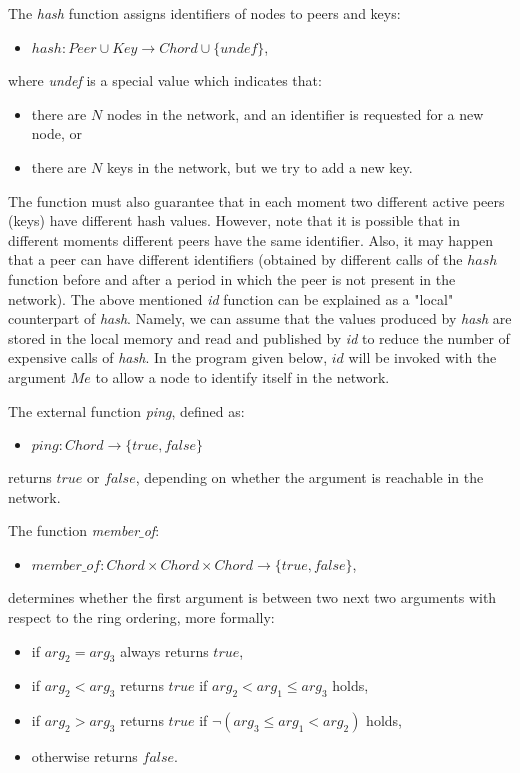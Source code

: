 \documentclass{amsart}
\theoremstyle{definition}
\begin{document}
The {\em hash} function assigns identifiers of nodes to peers and keys:
\begin{itemize}
    \item $hash: Peer \cup Key  \rightarrow Chord \cup \{undef\}$,
\end{itemize}
where {\em undef} is a special value which indicates that:
\begin{itemize}
    \item there are $N$ nodes in the network, and an identifier is requested for a new node, or
    \item there are $N$ keys in the network, but we try to add a new key.
\end{itemize}
The function must also guarantee that in each moment two different active peers (keys) have different hash values. However, note that
it is possible that in different moments different peers have the same identifier. Also, it may happen that a peer can have different
identifiers (obtained by different calls of the $hash$ function before and after a period in which the peer is not present in the
network).
The above mentioned {\em id} function can be explained as a "local" counterpart of {\em hash}. Namely, we can assume that the values
produced by {\em hash} are stored in the local memory and read and published by {\em id} to reduce the number of expensive calls of
{\em hash}.
In the program given below, $id$ will be invoked with the argument $Me$ to allow a node to identify itself in the network.

The external function {\em ping}, defined as:
\begin{itemize}
    \item $ping: Chord \rightarrow \{true, false\}$
\end{itemize}
returns $true$ or $false$, depending on whether the argument is reachable in the network.






The function {\em member$\_$of}:
\begin{itemize}
    \item $member\_of: Chord \times Chord \times Chord \rightarrow \{true, false\}$,
\end{itemize}
determines whether the first argument is between two next two arguments with respect to the ring ordering,
more formally:
\begin{itemize}
  \item if $arg_2 = arg_3$ always returns $true$,
  \item if $arg_2 < arg_3$ returns $true$ if $arg_2 < arg_1 \leqslant arg_3$ holds,
  \item if $arg_2 > arg_3$ returns $true$ if $\neg (arg_3 \leqslant arg_1 < arg_2)$ holds,
  \item otherwise returns $false$.
\end{itemize}
\end{document}
